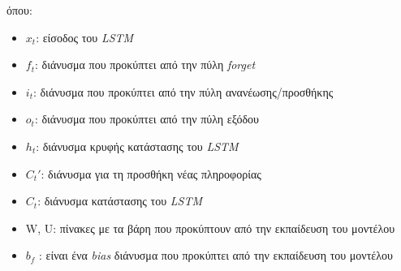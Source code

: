 όπου: 
\begin{itemize}
    \item $x_t$: είσοδος του \emph{LSTM}
    \item $f_t$: διάνυσμα που προκύπτει από την πύλη \emph{forget}
    \item $i_t$: διάνυσμα που προκύπτει από την πύλη ανανέωσης/προσθήκης
    \item $o_t$: διάνυσμα που προκύπτει από την πύλη εξόδου
    \item $h_t$: διάνυσμα κρυφής κατάστασης του \emph{LSTM}
    \item $C_t'$: διάνυσμα για τη προσθήκη νέας πληροφορίας
    \item $C_t$: διάνυσμα κατάστασης του \emph{LSTM}
    \item W, U: πίνακες με τα βάρη που προκύπτουν από την εκπαίδευση του μοντέλου
    \item $b_f$ : είναι ένα \emph{bias} διάνυσμα που προκύπτει από την εκπαίδευση του μοντέλου
\end{itemize}